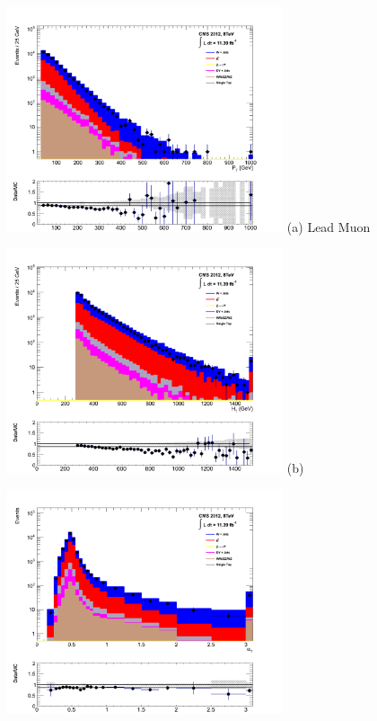 \begin{itemize}
\begin{minipage}{\linewidth}
\centering
\begin{minipage}{.48\textwidth}
\centering
\includegraphics[width = 3.2in]{plots/muon_leadmu_datamc.pdf}
(a) Lead Muon \pt
\end{minipage}
\begin{minipage}{.48\textwidth}
\centering
\includegraphics[width = 3.2in]{plots/muon_ht_datamc.pdf}
(b) \theht
\end{minipage}
\end{minipage}
\xspace
\begin{minipage}{\linewidth}
\centering
\begin{minipage}{.48\textwidth}
\centering
\includegraphics[width = 3.2in]{plots/muon_alphat_datamc.pdf}

\end{minipage}
\end{minipage}
\end{itemize}
